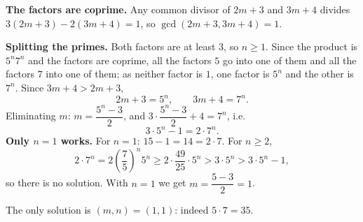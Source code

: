 \textbf{The factors are coprime.} Any common divisor of $2m+3$ and $3m+4$ divides $3(2m+3)-2(3m+4)=1$, so $\gcd(2m+3,3m+4)=1$.

\textbf{Splitting the primes.} Both factors are at least $3$, so $n\ge1$. Since the product is $5^n7^n$ and the factors are coprime, all the factors $5$ go into one of them and all the factors $7$ into one of them; as neither factor is $1$, one factor is $5^n$ and the other is $7^n$. Since $3m+4>2m+3$,
\[2m+3=5^n,\qquad3m+4=7^n.\]
Eliminating $m$: $m=\dfrac{5^n-3}{2}$, and $3\cdot\dfrac{5^n-3}{2}+4=7^n$, i.e.
\[3\cdot5^n-1=2\cdot7^n.\]
\textbf{Only $n=1$ works.} For $n=1$: $15-1=14=2\cdot7$. For $n\ge2$,
\[2\cdot7^n=2\left(\dfrac75\right)^n5^n\ge2\cdot\dfrac{49}{25}\cdot5^n>3\cdot5^n>3\cdot5^n-1,\]
so there is no solution. With $n=1$ we get $m=\dfrac{5-3}{2}=1$.

The only solution is $\boxed{(m,n)=(1,1)}$: indeed $5\cdot7=35$.
